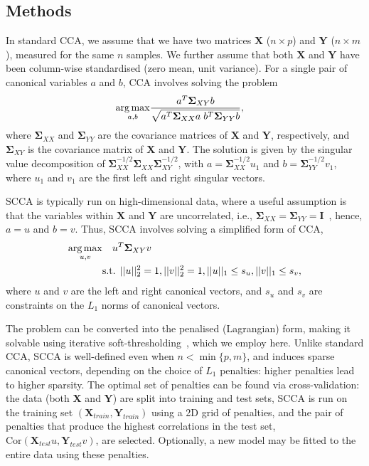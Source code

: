 \documentclass{bioinfo}
\DeclareMathOperator*{\argmax}{arg\,max}
\newcommand{\s}{\mathbf{\Sigma}}
\begin{document}
\begin{methods}
\section{Methods}

In standard CCA, we assume that we have two matrices $\mathbf{X}$ ($n \times p$)
and $\mathbf{Y}$ ($n \times m$), measured for the same $n$ samples.
We further assume that both $\mathbf{X}$ and $\mathbf{Y}$ have been
column-wise standardised (zero mean, unit variance).  For a single pair of 
canonical variables $a$ and $b$, CCA involves solving the problem
\vspace*{-10pt}
\begin{align}
\argmax_{a,b} & \frac{a^T \s_{XY} b}{
   \sqrt{a^T \s_{XX} a \; b^T \s_{YY} b}},
\label{eqn:cca}
\vspace*{-10pt}
\end{align}
where $\s_{XX}$ and $\s_{YY}$ are the covariance matrices of
$\mathbf{X}$ and $\mathbf{Y}$, respectively, and $\s_{XY}$ is the
covariance matrix of $\mathbf{X}$ and $\mathbf{Y}$. The solution is given by
the singular value decomposition of $\s_{XX}^{-1/2} \s_{XX}
\s_{XY}^{-1/2}$, with $a = \s_{XX}^{-1/2} u_1$ and $b =
\s_{YY}^{-1/2} v_1$, where $u_1$ and $v_1$ are the first left and right
singular vectors.

SCCA is typically run on high-dimensional data, where a useful assumption is that
the variables within $\mathbf{X}$ and $\mathbf{Y}$ are uncorrelated,
i.e., $\s_{XX}=\s_{YY}=\mathbf{I}$~\citep{Parkhomenko2009},
hence, $a = u$ and $b = v$. Thus, SCCA involves solving a simplified form of CCA,
\vspace*{-6pt}
\begin{align}
\argmax_{u,v} &  \quad u^T \s_{XY} v \notag \\
 & \mbox{s.t. } ||u||_2^2=1, ||v||_2^2 = 1, ||u||_1 \le s_u, ||v||_1 \le s_v,
\label{eqn:scca}\vspace*{-10pt}
\end{align}
where $u$ and $v$ are the left and right canonical vectors, 
and $s_u$ and $s_v$ are constraints on the $L_1$ norms
of canonical vectors.

The problem can be converted into the penalised (Lagrangian) form, making it
solvable using iterative soft-thresholding~\citep{Parkhomenko2009}, which we
employ here.  Unlike standard CCA, SCCA is well-defined even when $n{<}\min \{p,
m\}$, and induces sparse canonical vectors, depending on the choice of $L_1$
penalties: higher penalties lead to higher sparsity. The optimal set of
penalties can be found via cross-validation: the data (both $\mathbf{X}$ and
$\mathbf{Y}$) are split into training and test sets, SCCA is run on the training
set $(\mathbf{X}_{train}, \mathbf{Y}_{train})$ using a 2D grid of penalties, and
the pair of penalties that produce the highest correlations in the test set,
$\mbox{Cor}(\mathbf{X}_{test} u, \mathbf{Y}_{test} v)$, are selected.
Optionally, a new model may be fitted to the entire data using these penalties.

\enlargethispage{6pt}

\end{methods}
\end{document}
